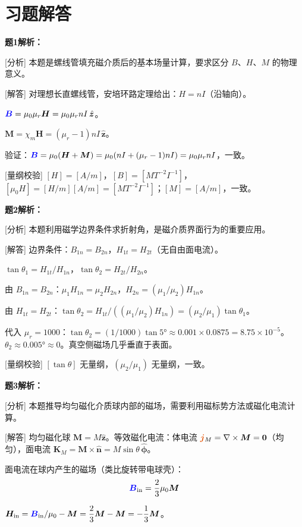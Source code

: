 \documentclass[11pt,a4paper,openany,oneside]{book}
\newcommand{\vecB}{\textcolor{blue}{\vect{B}}}
\newcommand{\vecJ}{\textcolor{cororange}{\vect{j}}}
\newcommand{\muz}{\mu_0}
\newcommand{\vect}[1]{\bm{#1}}
\newcommand{\unitvec}[1]{\hat{\vect{#1}}}
\newcommand{\curl}{\nabla\times}
\begin{document}
\section*{习题解答}

\textbf{题1解析：}

[分析] 本题是螺线管填充磁介质后的基本场量计算，要求区分 $B$、$H$、$M$ 的物理意义。

[解答] 对理想长直螺线管，安培环路定理给出：$H = nI$（沿轴向）。

$\vecB = \muz\mu_r\vect{H} = \muz\mu_r nI\,\unitvec{z}$。

$\vect{M} = \chi_m\vect{H} = (\mu_r - 1)nI\,\unitvec{z}$。

验证：$\vecB = \muz(\vect{H} + \vect{M}) = \muz(nI + (\mu_r - 1)nI) = \muz\mu_r nI$，一致。\qedsymbol

[量纲校验] $[H] = [A/m]$，$[B] = [MT^{-2}I^{-1}]$，$[\muz H] = [H/m][A/m] = [MT^{-2}I^{-1}]$；$[M] = [A/m]$，一致。\qedsymbol

\textbf{题2解析：}

[分析] 本题利用磁学边界条件求折射角，是磁介质界面行为的重要应用。

[解答] 边界条件：$B_{1n} = B_{2n}$，$H_{1t} = H_{2t}$（无自由面电流）。

$\tan\theta_1 = H_{1t}/H_{1n}$，$\tan\theta_2 = H_{2t}/H_{2n}$。

由 $B_{1n} = B_{2n}$：$\mu_1 H_{1n} = \mu_2 H_{2n}$，$H_{2n} = (\mu_1/\mu_2)H_{1n}$。

由 $H_{1t} = H_{2t}$：$\tan\theta_2 = H_{1t}/((\mu_1/\mu_2)H_{1n}) = (\mu_2/\mu_1)\tan\theta_1$。

代入 $\mu_r = 1000$：$\tan\theta_2 = (1/1000)\tan 5° \approx 0.001 \times 0.0875 = 8.75 \times 10^{-5}$。
$\theta_2 \approx 0.005° \approx 0$。真空侧磁场几乎垂直于表面。\qedsymbol

[量纲校验] $[\tan\theta]$ 无量纲，$(\mu_2/\mu_1)$ 无量纲，一致。\qedsymbol

\textbf{题3解析：}

[分析] 本题推导均匀磁化介质球内部的磁场，需要利用磁标势方法或磁化电流计算。

[解答] 均匀磁化球 $\vect{M} = M\unitvec{z}$。等效磁化电流：体电流 $\vecJ_M = \curl\vect{M} = \vect{0}$（均匀），面电流 $\vect{K}_M = \vect{M}\times\unitvec{n} = M\sin\theta\,\unitvec{\phi}$。

面电流在球内产生的磁场（类比旋转带电球壳）：
\[
\vecB_{\text{in}} = \frac{2}{3}\muz\vect{M}
\]

$\vect{H}_{\text{in}} = \vecB_{\text{in}}/\muz - \vect{M} = \dfrac{2}{3}\vect{M} - \vect{M} = -\dfrac{1}{3}\vect{M}$。
\end{document}
